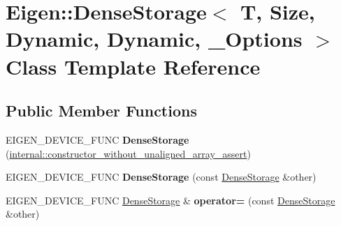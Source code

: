 \hypertarget{class_eigen_1_1_dense_storage_3_01_t_00_01_size_00_01_dynamic_00_01_dynamic_00_01___options_01_4}{}\section{Eigen\+:\+:Dense\+Storage$<$ T, Size, Dynamic, Dynamic, \+\_\+\+Options $>$ Class Template Reference}
\label{class_eigen_1_1_dense_storage_3_01_t_00_01_size_00_01_dynamic_00_01_dynamic_00_01___options_01_4}
\subsection*{Public Member Functions}
\begin{DoxyCompactItemize}
\item 
\mbox{\label{class_eigen_1_1_dense_storage_3_01_t_00_01_size_00_01_dynamic_00_01_dynamic_00_01___options_01_4_a8de609a6c9f045d7e8e9936ddfcfecf6}} 
E\+I\+G\+E\+N\+\_\+\+D\+E\+V\+I\+C\+E\+\_\+\+F\+U\+NC {\bfseries Dense\+Storage} (\hyperlink{struct_eigen_1_1internal_1_1constructor__without__unaligned__array__assert}{internal\+::constructor\+\_\+without\+\_\+unaligned\+\_\+array\+\_\+assert})
\item 
\mbox{\label{class_eigen_1_1_dense_storage_3_01_t_00_01_size_00_01_dynamic_00_01_dynamic_00_01___options_01_4_a42d45ee76bf4a768d620ced260705030}} 
E\+I\+G\+E\+N\+\_\+\+D\+E\+V\+I\+C\+E\+\_\+\+F\+U\+NC {\bfseries Dense\+Storage} (const \hyperlink{class_eigen_1_1_dense_storage}{Dense\+Storage} \&other)
\item 
\mbox{\label{class_eigen_1_1_dense_storage_3_01_t_00_01_size_00_01_dynamic_00_01_dynamic_00_01___options_01_4_a61e87e4dba324fd4bd3e54bae19e3214}} 
E\+I\+G\+E\+N\+\_\+\+D\+E\+V\+I\+C\+E\+\_\+\+F\+U\+NC \hyperlink{class_eigen_1_1_dense_storage}{Dense\+Storage} \& {\bfseries operator=} (const \hyperlink{class_eigen_1_1_dense_storage}{Dense\+Storage} \&other)
\item 
\mbox{\label{class_eigen_1_1_dense_storage_3_01_t_00_01_size_00_01_dynamic_00_01_dynamic_00_01___options_01_4_aa58cf9abb23cc7374a15f836596612d3}} 

\end{DoxyCompactItemize}
